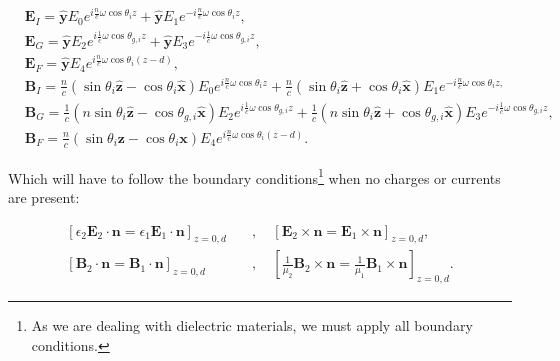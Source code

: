 \begin{equation}
	\begin{split}
		&\mathbf{E}_{I}=\hat{\mathbf{y}} E_{0} e^{i \frac{n}{c} \omega \cos \theta_{i} z}+\hat{\mathbf{y}} E_{1} e^{-i \frac{n}{c} \omega \cos \theta_{i} z},\\
		&\mathbf{E}_{G}=\hat{\mathbf{y}} E_{2} e^{i \frac{1}{c} \omega \cos \theta_{g, i} z}+\hat{\mathbf{y}} E_{3} e^{-i \frac{1}{c} \omega \cos \theta_{g, i} z},\\
		&\mathbf{E}_{F}=\hat{\mathbf{y}} E_{4} e^{i \frac{n}{c} \omega \cos \theta_{i}(z-d)},\\
		&\mathbf{B}_{I}=\tfrac{n}{c}\left(\sin \theta_{i} \hat{\mathbf{z}}-\cos \theta_{i} \hat{\mathbf{x}}\right) E_{0} e^{i \frac{n}{c} \omega \cos \theta_{i} z}+\tfrac{n}{c}\left(\sin \theta_{i} \hat{\mathbf{z}}+\cos \theta_{i} \hat{\mathbf{x}}\right) E_{1} e^{-i \frac{n}{c} \omega \cos \theta_{i} z,}\\
		&\mathbf{B}_{G}=\tfrac{1}{c}\left(n \sin \theta_{i} \hat{\mathbf{z}}-\cos \theta_{g, i} \hat{\mathbf{x}}\right) E_{2} e^{i \frac{1}{c} \omega \cos \theta_{g, i} z}+\tfrac{1}{c}\left(n \sin \theta_{i} \hat{\mathbf{z}}+\cos \theta_{g, i} \hat{\mathbf{x}}\right) E_{3} e^{-i \frac{1}{c} \omega \cos \theta_{g, i} z},\\
		&\mathbf{B}_{F}=\tfrac{n}{c}\left(\sin \theta_{i} \mathbf{z}-\cos \theta_{i} \mathbf{x}\right) E_{4} e^{i \tfrac{n}{c} \omega \cos \theta_{i}(z-d)}.
	\end{split}
\end{equation}

Which will have to follow the boundary conditions\footnote{As we are dealing with dielectric materials, we must apply all boundary conditions.} when no charges or currents are present:

\begin{equation}
	\begin{split}
	\left[\epsilon_{2} \mathbf{E}_{2} \cdot \mathbf{n}=\epsilon_{1} \mathbf{E}_{1} \cdot \mathbf{n}\right]_{z=0,d} \quad&, \quad\left[\mathbf{E}_{2} \times \mathbf{n}=\mathbf{E}_{1} \times \mathbf{n}\right]_{z=0,d},\\
	\left[\mathbf{B}_{2} \cdot \mathbf{n}=\mathbf{B}_{1} \cdot \mathbf{n}\right]_{z=0,d} \quad&, \quad\left[\tfrac{1}{\mu_{2}} \mathbf{B}_{2} \times \mathbf{n}=\tfrac{1}{\mu_{1}} \mathbf{B}_{1} \times \mathbf{n}\right]_{z=0,d}.
	\end{split}
\end{equation}


